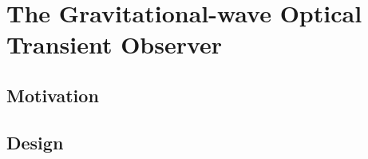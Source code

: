 \newpage
\section{The Gravitational-wave Optical Transient Observer}
\label{sec:goto}

\lipsum{}

\subsection{Motivation}
\label{sec:gw-motivation}

\lipsum{}

\subsection{Design}
\label{sec:gw-design}

\lipsum{}
